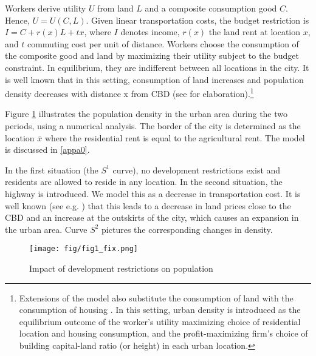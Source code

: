 \documentclass[a4paper,authoryear,review]{elsarticle}  	%
\begin{document}
	Workers derive utility $U$ from land $L$ and a composite consumption good $C$. Hence, $U=U(C,L)$. Given linear transportation costs, the budget restriction is $I=C+r(x)L + tx$, where $I$ denotes income, $r(x)$ the land rent at location $x$, and $t$ commuting cost per unit of distance.
	Workers choose the consumption of the composite good and land by maximizing their utility subject to the budget constraint. In equilibrium, they are indifferent between all locations in the city. It is well known that in this setting, consumption of land increases and population density decreases with distance x from CBD (see \citet{Glaeser2008b,Brueckner1987} for elaboration).\footnote{Extensions of the model also substitute the consumption of land with the consumption of housing \citep{Muth1969,Brueckner1987,Glaeser2008b}. In this setting, urban density is introduced as the equilibrium outcome of the worker's utility maximizing choice of residential location and housing consumption, and the profit-maximizing firm's choice of building capital-land ratio (or height) in each urban location.}  
	
	Figure \ref{ch3.fig:1} illustrates the population density in the urban area during the two periods, using a numerical analysis. The border of the city is determined as the location $\bar{x}$ where the residential rent is equal to the agricultural rent. The model is discussed in \ref{appa0}. 	
	
	In the first situation (the $S^{1}$ curve), no development restrictions exist and residents are allowed to reside in any location. In the second situation, the highway is introduced. We  model this as a decrease in transportation cost. It is well known (see e.g. \citet{Brueckner1987}) that this leads to a decrease in land prices close to the CBD and an increase at the outskirts of the city, which causes an expansion in the urban area.
	Curve $S^{2}$ pictures the corresponding changes in density. 
		
	\begin{figure}[!hbtp]
		\centering
		\caption{Impact of development restrictions on population}
		\texttt{[image: fig/fig1\_fix.png]}\label{ch3.fig:1}
	\end{figure}
	
\end{document}
